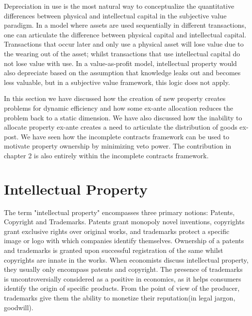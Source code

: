 Depreciation in use is the most natural way to conceptualize the quantitative differences between physical and intellectual capital in the subjective value paradigm. In a model where assets are used sequentially in different transactions, one can articulate the difference between physical capital and intellectual capital. Transactions that occur later and only use a physical asset will lose value due to the wearing out of the asset; whilst transactions that use intellectual capital do not lose value with use. In a value-as-profit model, intellectual property would also depreciate based on the assumption that knowledge leaks out and becomes less valuable, but in a subjective value framework, this logic does not apply.

In this section we have discussed how the creation of new property creates problems for dynamic efficiency and how some ex-ante allocation reduces the problem back to a static dimension. We have also discussed how the inability to allocate property ex-ante creates a need to articulate the distribution of goods ex-post. We have seen how the incomplete contracts framework can be used to motivate property ownership by minimizing veto power. The contribution in chapter 2 is also entirely within the incomplete contracts framework. 

\newpage
\section{Intellectual Property}\label{intellectual}

The term "intellectual property" encompasses three primary notions: Patents, Copyright and Trademarks. Patents grant monopoly novel inventions, copyrights grant exclusive rights over original works, and trademarks protect a specific image or logo with which companies identify themselves. Ownership of a patents and trademarks is granted upon successful registration of the same whilst copyrights are innate in the works. When economists discuss intellectual property, they usually only encompass patents and copyright. The presence of trademarks is uncontroversially considered as a positive in economics, as it helps consumers identify the origin of specific products. From the point of view of the producer, trademarks give them the ability to monetize their reputation(in legal jargon, goodwill). 


